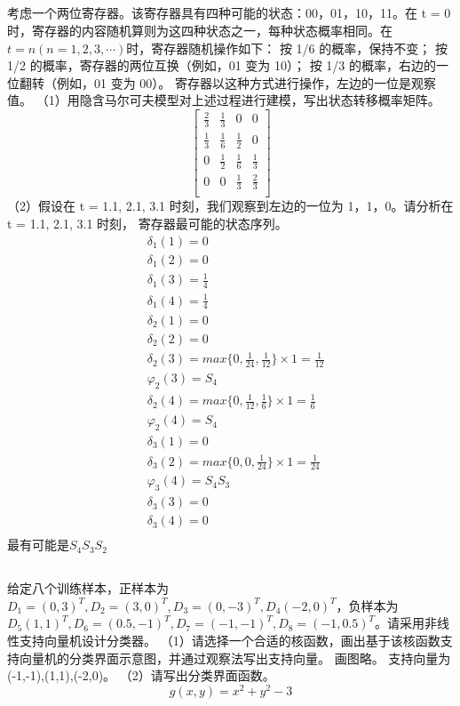 \documentclass[UTF8]{ctexart}
\begin{document}
\subsection{}
考虑一个两位寄存器。该寄存器具有四种可能的状态：00，01，10，11。在 t = 0 时，寄存器的内容随机算则为这四种状态之一，每种状态概率相同。在$t=n(n=1,2,3,\cdots)$时，寄存器随机操作如下：
按 1/6 的概率，保持不变；
按 1/2 的概率，寄存器的两位互换（例如，01 变为 10）；
按 1/3 的概率，右边的一位翻转（例如，01 变为 00）。
寄存器以这种方式进行操作，左边的一位是观察值。
（1）用隐含马尔可夫模型对上述过程进行建模，写出状态转移概率矩阵。
\begin{equation*}
\begin{bmatrix}
\frac{2}{3} &\frac{1}{3} &0 &0\\
\frac{1}{3} &\frac{1}{6} &\frac{1}{2} &0\\
0 &\frac{1}{2} &\frac{1}{6} &\frac{1}{3}\\
0 &0 &\frac{1}{3} &\frac{2}{3}\\
\end{bmatrix}
\end{equation*}
（2）假设在 t = 1.1, 2.1, 3.1 时刻，我们观察到左边的一位为 1，1，0。请分析在 t = 1.1, 2.1, 3.1 时刻，
寄存器最可能的状态序列。
\begin{equation*}
\begin{aligned}
&\delta_1(1)=0\\
&\delta_1(2)=0\\
&\delta_1(3)=\frac{1}{4}\\
&\delta_1(4)=\frac{1}{4}\\
&\delta_2(1)=0\\
&\delta_2(2)=0\\
&\delta_2(3)=max\{0,\frac{1}{24},\frac{1}{12}\}\times1=\frac{1}{12}\\
&\varphi_2(3)=S_4\\
&\delta_2(4)=max\{0,\frac{1}{12},\frac{1}{6}\}\times1=\frac{1}{6}\\
&\varphi_2(4)=S_4\\
&\delta_3(1)=0\\
&\delta_3(2)=max\{0,0,\frac{1}{24}\}\times1=\frac{1}{24}\\
&\varphi_3(4)=S_4S_3\\
&\delta_3(3)=0\\
&\delta_3(4)=0\\
\end{aligned}
\end{equation*}
最有可能是$S_4S_3S_2$
\subsection{}
给定八个训练样本，正样本为$D_1=(0,3)^T,D_2=(3,0)^T,D_3=(0,-3)^T,D_4(-2,0)^T$，负样本为$D_5(1,1)^T,D_6=(0.5,-1)^T,D_7=(-1,-1)^T,D_8=(-1,0.5)^T$。请采用非线性支持向量机设计分类器。
（1）请选择一个合适的核函数，画出基于该核函数支持向量机的分类界面示意图，并通过观察法写出支持向量。
画图略。
支持向量为(-1,-1),(1,1),(-2,0)。
（2）请写出分类界面函数。
\begin{equation*}
g(x,y)=x^2+y^2-3
\end{equation*}
\end{document}
